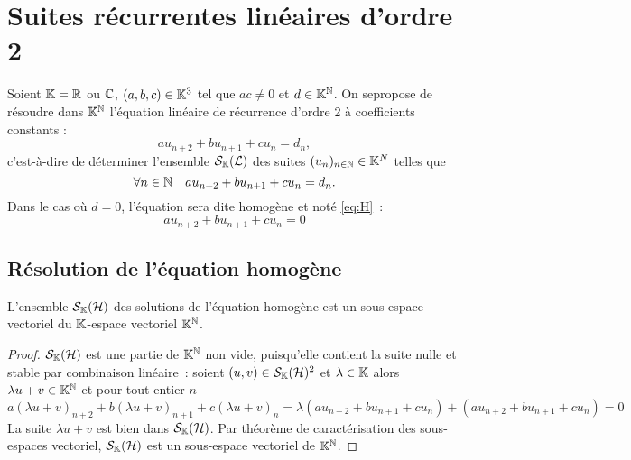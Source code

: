 \section{Suites récurrentes linéaires d'ordre 2}

Soient \(\mathbb{K}=\mathbb{R}\) ou \(\mathbb{C}\), \((a,b,c) \in \mathbb{K}^3\) tel que \(ac \neq 0\) et \(d \in \mathbb{K}^{\mathbb{N}}\). On sepropose de résoudre dans \(\mathbb{K}^{\mathbb{N}}\) l'équation linéaire de récurrence d'ordre 2 à coefficients constants :
\begin{equation}
  au_{n+2}+bu_{n+1}+cu_n = d_n \label{eq:S} \tag{\(\Lb\)},
\end{equation}
c'est-à-dire de déterminer l'ensemble \(\mathcal{S}_{\mathbb{K}}(\mathcal{L})\) des suites \((u_n)_{n \in \mathbb{N}} \in \mathbb{K}^N\) telles que
\begin{equation}
  \forall n \in \mathbb{N} \quad au_{n+2}+bu_{n+1}+cu_n = d_n.
\end{equation}
Dans le cas où \(d=0\), l'équation sera dite homogène et noté \eqref{eq:H}~:
\begin{equation}
  au_{n+2}+bu_{n+1}+cu_n = 0 \label{eq:H} \tag{\(\H\)}
\end{equation}

\subsection{Résolution de l'équation homogène}

\begin{prop}
  L'ensemble \(\mathcal{S}_{\mathbb{K}}(\mathcal{H})\) des solutions de l'équation homogène est un sous-espace vectoriel du \(\mathbb{K}\)-espace vectoriel \(\mathbb{K}^{\mathbb{N}}\).
\end{prop}
\begin{proof}
  \(\mathcal{S}_{\mathbb{K}}(\mathcal{H})\) est une partie de \(\mathbb{K}^{\mathbb{N}}\) non vide, puisqu'elle contient la suite nulle et stable par combinaison linéaire~:
  soient \((u,v) \in \mathcal{S}_{\mathbb{K}}(\mathcal{H})^2\) et \(\lambda \in \mathbb{K}\) alors \(\lambda u +v \in \mathbb{K}^{\mathbb{N}}\) et pour tout entier \(n\)
  \begin{equation}
    a(\lambda u+v)_{n+2} +b(\lambda u+v)_{n+1} +c(\lambda u+v)_n = \lambda (au_{n+2}+bu_{n+1}+cu_n) + (au_{n+2}+bu_{n+1}+cu_n)=0
  \end{equation}
  La suite \(\lambda u+v\) est bien dans \(\mathcal{S}_{\mathbb{K}}(\mathcal{H})\). Par théorème de caractérisation des sous-espaces vectoriel, \(\mathcal{S}_{\mathbb{K}}(\mathcal{H})\) est un sous-espace vectoriel de \(\mathbb{K}^{\mathbb{N}}\).
\end{proof}

